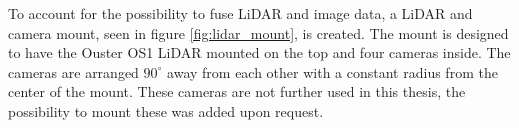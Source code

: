 



To account for the possibility to fuse LiDAR and image data, a LiDAR and camera mount, seen in figure \ref{fig:lidar_mount}, is created. The mount is designed to have the Ouster OS1 LiDAR mounted on the top and four cameras inside. The cameras are arranged $90^\circ$ away from each other with a constant radius from the center of the mount. These cameras are not further used in this thesis, the possibility to mount these was added upon request.


